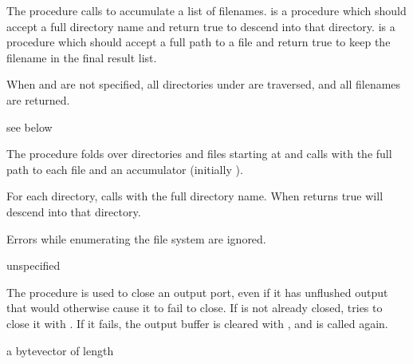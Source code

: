 The  procedure calls  to
accumulate a list of filenames.  is a procedure which
should accept a full directory name and return true to descend into
that directory.  is a procedure which should accept a
full path to a file and return true to keep the filename in the final
result list.

When  and  are not specified, all
directories under  are traversed, and all filenames are
returned.

\begin{procedure}
\end{procedure}
\returns{} see below

The  procedure folds over directories and files
starting at  and calls  with the full path to each
file and an accumulator (initially ).

For each directory,  calls  with the
full directory name. When  returns true
 will descend into that directory.

Errors while enumerating the file system are ignored.

\begin{procedure}
\end{procedure}
\returns{} unspecified

The  procedure is used to close an
output port, even if it has unflushed output that would otherwise
cause it to fail to close.  If  is not already closed,
 tries to close it with
. If it fails, the output buffer is
cleared with , and
 is called again.

\begin{procedure}
\end{procedure}
\returns{} a bytevector of length 

